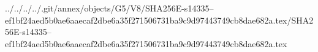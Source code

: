 ../../../../.git/annex/objects/G5/V8/SHA256E-s14335--ef1bf24aed5b0ae6aaecaf2dbe6a35f271506731ba9c9d97443749cb8dae682a.tex/SHA256E-s14335--ef1bf24aed5b0ae6aaecaf2dbe6a35f271506731ba9c9d97443749cb8dae682a.tex
